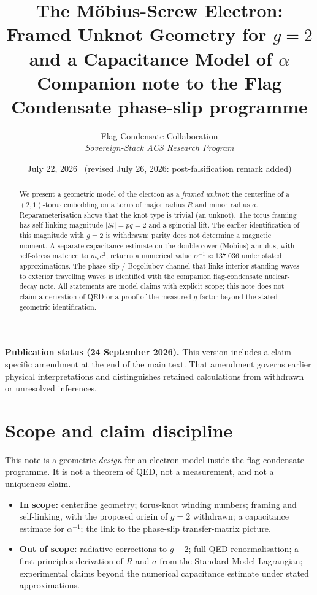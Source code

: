 \documentclass[11pt,a4paper]{article}
\title{\textbf{The M\"obius-Screw Electron:\\
Framed Unknot Geometry for $g=2$ and a Capacitance Model of $\alpha$}\\[0.35em]
\large Companion note to the Flag Condensate phase-slip programme}
\author{Flag Condensate Collaboration\\
\small\textit{Sovereign-Stack ACS Research Program}}
\date{July 22, 2026 \ (revised July 26, 2026: post-falsification remark added)}
\begin{document}
\maketitle

\begin{abstract}
We present a geometric model of the electron as a \emph{framed unknot}:
the centerline of a $(2,1)$-torus embedding on a torus of major radius $R$
and minor radius $a$.  Reparameterisation shows that the knot type is
trivial (an unknot). The torus framing has self-linking magnitude
$|Sl|=pq=2$ and a spinorial lift. The earlier identification of this
magnitude with $g=2$ is withdrawn: parity does not determine a magnetic moment.  A separate capacitance estimate on the
double-cover (M\"obius) annulus, with self-stress matched to $m_e c^2$,
returns a numerical value $\alpha^{-1}\approx 137.036$ under stated
approximations.  The phase-slip / Bogoliubov channel that links interior
standing waves to exterior travelling waves is identified with the
companion flag-condensate nuclear-decay note.  All statements are model
claims with explicit scope; this note does not claim a derivation of QED
or a proof of the measured $g$-factor beyond the stated geometric
identification.
\end{abstract}
\par\smallskip\noindent\textbf{Publication status (24 September 2026).}
This version includes a claim-specific amendment at the end of the main text.
That amendment governs earlier physical interpretations and distinguishes
retained calculations from withdrawn or unresolved inferences.\par\smallskip


\begingroup\small\tableofcontents\endgroup
\newpage

\section{Scope and claim discipline}
\label{sec:scope}

This note is a geometric \emph{design} for an electron model inside the
flag-condensate programme.  It is not a theorem of QED, not a measurement,
and not a uniqueness claim.

\begin{itemize}[leftmargin=1.3em,itemsep=2pt]
  \item \textbf{In scope:} centerline geometry; torus-knot winding numbers;
        framing and self-linking, with the proposed origin of
        $g=2$ withdrawn; a capacitance estimate for $\alpha^{-1}$; the link to
        the phase-slip transfer-matrix picture.
  \item \textbf{Out of scope:} radiative corrections to $g-2$; full QED
        renormalisation; a first-principles derivation of $R$ and $a$
        from the Standard Model Lagrangian; experimental claims beyond
        the numerical capacitance estimate under stated approximations.
\end{itemize}
\end{document}
